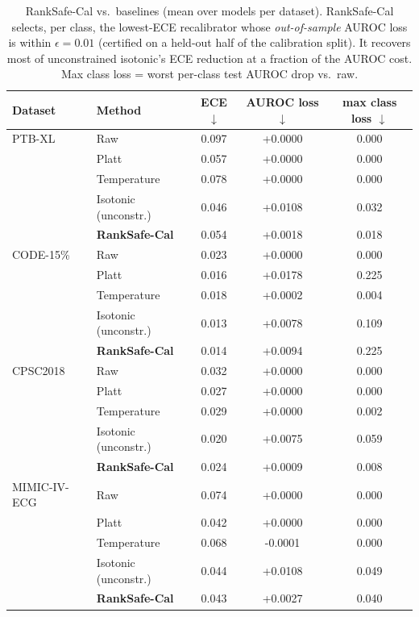 \begin{table}[t]
\centering
\caption{RankSafe-Cal vs.\ baselines (mean over models per dataset). RankSafe-Cal selects, per class, the lowest-ECE recalibrator whose \emph{out-of-sample} AUROC loss is within $\epsilon{=}0.01$ (certified on a held-out half of the calibration split). It recovers most of unconstrained isotonic's ECE reduction at a fraction of the AUROC cost. Max class loss = worst per-class test AUROC drop vs.\ raw.}
\label{tab:ranksafe}
\small
\begin{tabular}{llccc}
\toprule
Dataset & Method & ECE $\downarrow$ & AUROC loss $\downarrow$ & max class loss $\downarrow$ \\
\midrule
  PTB-XL & Raw & 0.097 & +0.0000 & 0.000 \\
   & Platt & 0.057 & +0.0000 & 0.000 \\
   & Temperature & 0.078 & +0.0000 & 0.000 \\
   & Isotonic (unconstr.) & 0.046 & +0.0108 & 0.032 \\
   & \textbf{RankSafe-Cal} & 0.054 & +0.0018 & 0.018 \\
  \midrule
  CODE-15\% & Raw & 0.023 & +0.0000 & 0.000 \\
   & Platt & 0.016 & +0.0178 & 0.225 \\
   & Temperature & 0.018 & +0.0002 & 0.004 \\
   & Isotonic (unconstr.) & 0.013 & +0.0078 & 0.109 \\
   & \textbf{RankSafe-Cal} & 0.014 & +0.0094 & 0.225 \\
  \midrule
  CPSC2018 & Raw & 0.032 & +0.0000 & 0.000 \\
   & Platt & 0.027 & +0.0000 & 0.000 \\
   & Temperature & 0.029 & +0.0000 & 0.002 \\
   & Isotonic (unconstr.) & 0.020 & +0.0075 & 0.059 \\
   & \textbf{RankSafe-Cal} & 0.024 & +0.0009 & 0.008 \\
  \midrule
  MIMIC-IV-ECG & Raw & 0.074 & +0.0000 & 0.000 \\
   & Platt & 0.042 & +0.0000 & 0.000 \\
   & Temperature & 0.068 & -0.0001 & 0.000 \\
   & Isotonic (unconstr.) & 0.044 & +0.0108 & 0.049 \\
   & \textbf{RankSafe-Cal} & 0.043 & +0.0027 & 0.040 \\
\bottomrule
\end{tabular}
\end{table}